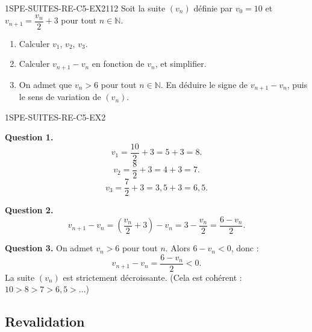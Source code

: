 
\begin{exercice}{1SPE-SUITES-RE-C5-EX2}{1}{12}
Soit la suite $(v_n)$ définie par $v_0 = 10$ et $v_{n+1} = \dfrac{v_n}{2} + 3$ pour tout $n \in \mathbb{N}$.
\begin{enumerate}
  \item Calculer $v_1$, $v_2$, $v_3$.
  \item Calculer $v_{n+1} - v_n$ en fonction de $v_n$, et simplifier.
  \item On admet que $v_n > 6$ pour tout $n \in \mathbb{N}$. En déduire le signe de $v_{n+1} - v_n$, puis le sens de variation de $(v_n)$.
\end{enumerate}
\end{exercice}


\begin{corrige}{1SPE-SUITES-RE-C5-EX2}

\textbf{Question 1.}
\[
v_1 = \frac{10}{2} + 3 = 5 + 3 = 8.
\]
\[
v_2 = \frac{8}{2} + 3 = 4 + 3 = 7.
\]
\[
v_3 = \frac{7}{2} + 3 = 3{,}5 + 3 = 6{,}5.
\]


\textbf{Question 2.}
\[
v_{n+1} - v_n = \left(\frac{v_n}{2} + 3\right) - v_n = 3 - \frac{v_n}{2} = \frac{6 - v_n}{2}.
\]


\textbf{Question 3.} On admet $v_n > 6$ pour tout $n$. Alors $6 - v_n < 0$, donc :
\[
v_{n+1} - v_n = \frac{6 - v_n}{2} < 0.
\]
La suite $(v_n)$ est strictement décroissante. (Cela est cohérent : $10 > 8 > 7 > 6{,}5 > \ldots$)

\end{corrige}

\subsection*{Revalidation}

